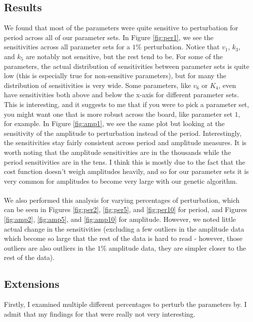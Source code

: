 \documentclass[]{article}
\begin{document}
	\subsection{Results}
	We found that most of the parameters were quite sensitive to perturbation for period across all of our parameter sets. In Figure \ref{fig:per1}, we see the sensitivities across all parameter sets for a $1\%$ perturbation. Notice that $v_1$, $k_3$, and $k_5$ are notably not sensitive, but the rest tend to be. For some of the parameters, the actual distribution of sensitivities between parameter sets is quite low (this is especially true for non-sensitive parameters), but for many the distribution of sensitivities is very wide. Some parameters, like $v_6$ or $K_4$, even have sensitivities both above and below the x-axis for different parameter sets. This is interesting, and it suggests to me that if you were to pick a parameter set, you might want one that is more robust across the board, like parameter set $1$, for example. In Figure \ref{fig:amp1}, we see the same plot but looking at the sensitivity of the amplitude to perturbation instead of the period. Interestingly, the sensitivities stay fairly consistent across period and amplitude measures. It is worth noting that the amplitude sensitivities are in the thousands while the period sensitivities are in the tens. I think this is mostly due to the fact that the cost function doesn't weigh amplitudes heavily, and so for our parameter sets it is very common for amplitudes to become very large with our genetic algorithm. \\ \\
	
	We also performed this analysis for varying percentages of perturbation, which can be seen in Figures \ref{fig:per2}, \ref{fig:per5}, and \ref{fig:per10} for period, and Figures \ref{fig:amp2}, \ref{fig:amp5}, and \ref{fig:amp10} for amplitude. However, we noted little actual change in the sensitivities (excluding a few outliers in the amplitude data which become so large that the rest of the data is hard to read - however, those outliers are also outliers in the $1\%$ amplitude data, they are simpler closer to the rest of the data).
	
	\subsection{Extensions}
	Firstly, I examined multiple different percentages to perturb the parameters by. I admit that my findings for that were really not very interesting. \\ \\
	
\end{document}
